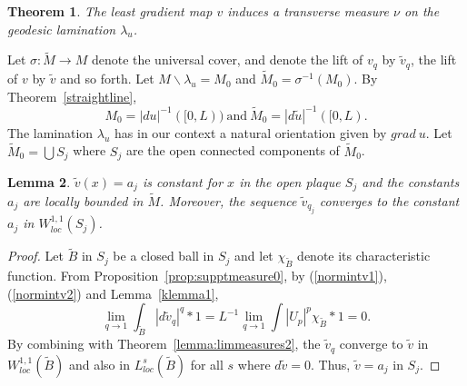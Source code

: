 \documentclass{ip-journal}
\newtheorem{theorem}{Theorem}[section]
\newtheorem{lemma}[theorem]{Lemma}
\theoremstyle{definition}
\numberwithin{equation}{section}
\begin{document}
\begin{theorem}\label{transmeasure}The least gradient map $v$ induces a transverse measure $\nu$ on the geodesic lamination $\lambda_u$. 
\end{theorem}

Let   $\sigma: \tilde M \rightarrow M$ denote the universal cover, and denote the lift of $v_q$ by $\tilde v_q$, the lift of $v$ by $\tilde v$ and so forth.
 Let $M \backslash  \lambda_u = M_0$ and $\tilde M_0 = \sigma^{-1}(M_0)$. 
By Theorem~\ref{straightline},
\begin{equation}\label{MLemma1}
M_0 = |du|^{-1}([0,L)) \ \mbox{and} \ \tilde M_0 = |d\tilde u|^{-1}([0,L).
\end{equation}
The lamination $\lambda_u$ has in our context a natural orientation given by $grad\ u$.
Let $\tilde M_0 =\bigcup S_j$ where $S_j$ are the open connected components of $\tilde M_0$.
 \begin{lemma}\label{MLemma2} $\tilde v(x) = a_j$ is constant for $x$ in the open plaque $S_j$ and the constants $a_j$ are locally bounded in $\tilde M$.
Moreover, the sequence $\tilde v_{q_j}$ converges to the constant $a_j$ in 
$W^{1,1}_{loc}(S_j)$. 
\end{lemma}
\begin{proof}
Let $\tilde B$ in $S_j$ be a closed ball in $S_j$ and let $\chi_{\tilde B}$ denote its characteristic function. From Proposition~\ref{prop:supptmeasure0}, by (\ref{normintv1}), (\ref{normintv2}) and Lemma~\ref{klemma1}, 
\[
\lim_{q \rightarrow 1} \int_{\tilde B} |d \tilde v_q|^q *1 =
L^{-1} \lim_{q \rightarrow 1} \int |U_p|^p \chi_{\tilde B}*1 = 0.
\]
By combining with Theorem~\ref{lemma:limmeasures2}, the  $\tilde v_q $ converge to $\tilde v$ in $W^{1,1}_{loc}(\tilde B)$ and also in $L^s_{loc}(\tilde B)$ for all $s$ where $d\tilde v=0$. Thus,  $\tilde v=a_j$ in $S_j$.
\end{proof}
\end{document}
